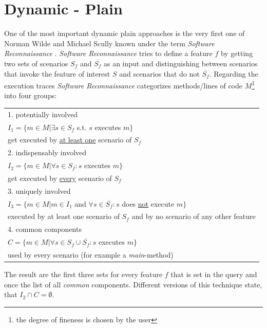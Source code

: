 \section{Dynamic - Plain}
\label{sec:Wilde}
One of the most important dynamic plain approaches is the very first one of Norman Wilde and Michael Scully known under the term \emph{Software Reconnaissance} \cite{wilde1995software}. \textit{Software Reconnaissance} tries to define a feature $f$ by getting two sets of scenarios $S_f$ and $\overline{S_f}$ as an input and distinguishing between scenarios that invoke the feature of interest $S$ and scenarios that do not $\overline{S_f}$. \newline
Regarding the execution traces \textit{Software Reconnaissance} categorizes methods/lines of code $M$\footnote{the degree of fineness is chosen by the user} into four groups:
\begin{table}[h]
	\begin{tabular}{l}
		1. potentially involved  \\
 		\qquad $I_1 = \{ m \in M | \exists s \in S_f$ s.t. $s$ executes $m \}$ \\
 		\qquad get executed by \underline{at least one} scenario of $S_f$\\
		2. indispensably involved  \\
		\qquad $I_2 = \{ m \in M | \forall s \in S_f : s$ executes $m \}$ \\
		\qquad get executed by \underline{every} scenario of $S_f$\\
		3. uniquely involved  \\
		\qquad $I_3 = \{ m \in M | m \in I_1$ and $\forall s\in \overline{S_f} : s$ does \underline{not} execute $m \}$ \\
		\qquad executed by at least one scenario of $S_f$ and by no scenario of any other feature\\
		4. common components  \\
		\qquad $C = \{ m \in M | \forall s \in S_f \cup \overline{S_f}:s$ executes $m \}$ \\
		\qquad used by every scenario (for example a \textit{main}-method)
	\end{tabular}
\end{table} \newline
The result are the first three sets for every feature $f$ that is set in the query and once the list of all \textit{common} components. Different versions of this technique state, that $I_2 \cap C = \emptyset$.\cite{wilde1995software} \newline
